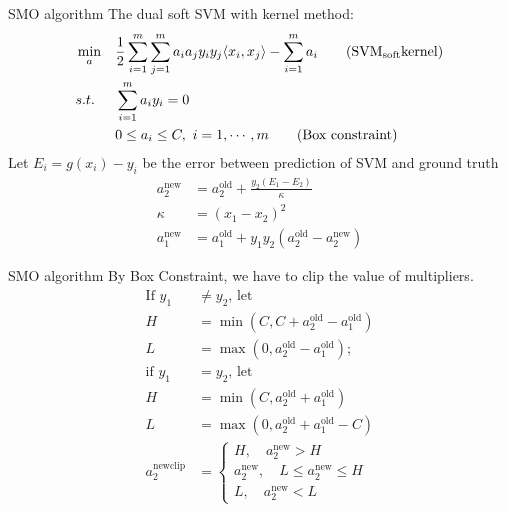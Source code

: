 \documentclass[10pt,aspectratio=43,mathserif]{beamer}
\begin{document}
\begin{frame}{SMO algorithm}
The dual soft SVM with kernel method:
\begin{align*}
    &\min_a & & \frac{1}{2} \sum_{i=1}^m\sum_{j=1}^m a_i a_j y_i y_j \langle x_i, x_j\rangle - \sum_{i=1}^m a_i  \label{softsvmm}\tag{$\mathrm{SVM_{soft} kernel}$}\\
    &s.t. \ & & \sum_{i=1}^m a_i y_i=0 \\
    & & & 0\leq a_i \leq C,\ i=1,\cdots,m  \tag{Box constraint}
\end{align*}
Let $E_i=g(x_i)-y_i$ be the error between prediction of SVM and ground truth
\begin{align*}
    a_2^{\mathrm{new}} &= a_2^{\mathrm{old}}+\frac{y_2(E_1-E_2)}{\kappa} \\
    \kappa &=(x_1-x_2)^2 \\
    a_1^{\mathrm{new}} &=a_1^{\mathrm{old}}+ y_1y_2(a_2^{\mathrm{old}}- a_2^{\mathrm{new}}) 
\end{align*}
\end{frame}
\begin{frame}{SMO algorithm}
By Box Constraint, we have to clip the value of multipliers.
\begin{align*}
\text{If }y_1&\neq y_2\text{, let} \\
    H&=\min(C,C+a_2^{\mathrm{old}}-a_1^{\mathrm{old}}) \\
    L&=\max(0,a_2^{\mathrm{old}}-a_1^{\mathrm{old}}); \\
\text{if }y_1&=y_2\text{,  let} \\
    H&=\min(C,a_2^{\mathrm{old}}+a_1^{\mathrm{old}}) \\
    L&=\max(0,a_2^{\mathrm{old}}+a_1^{\mathrm{old}}-C)\\
        a_2^{\mathrm{new clip}} &= 
    \begin{cases}
        H, \quad a_2^{\mathrm{new}}>H \\
        a_2^{\mathrm{new}}, \quad L\leq a_2^{\mathrm{new}} \leq H \\
        L, \quad a_2^{\mathrm{new}} <L
    \end{cases}
\end{align*}
\end{frame}
\end{document}
